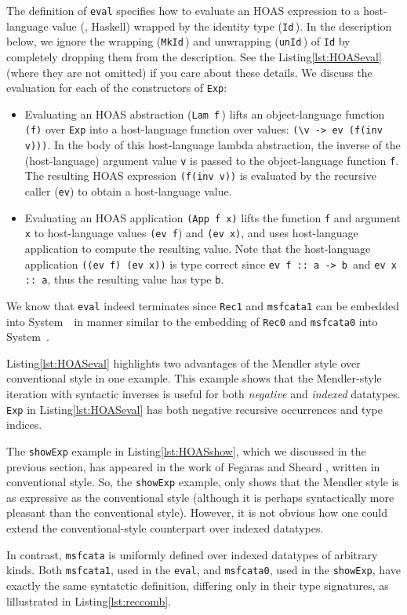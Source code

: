 The definition of \lstinline{eval} specifies how to evaluate
an HOAS expression to a host-language value (\ie, Haskell) wrapped by
the identity type (\lstinline{Id}\,). In the description below, we ignore
the wrapping (\lstinline{MkId}\,) and unwrapping (\lstinline{unId}\,) of
\lstinline{Id} by completely dropping them from the description.
See the Listing\;\ref{lst:HOASeval} (where they are not omitted)
if you care about these details. We discuss the evaluation for each of
the constructors of \lstinline{Exp}:
\begin{itemize}
	\item Evaluating an HOAS abstraction (\lstinline{Lam f}\,) lifts
		an object-language function \lstinline{(f)} over \lstinline{Exp}
		into a host-language function over values:
		\lstinline{(\v -> ev (f(inv v)))}.
		In the body of this host-language lambda abstraction,
		the inverse of the (host-language) argument value \lstinline{v}
		is passed to the object-language function \lstinline{f}.
		The resulting HOAS expression \lstinline{(f(inv v))} is
		evaluated by the recursive caller (\lstinline{ev}) to
		obtain a host-language value.

	\item Evaluating an HOAS application \lstinline{(App f x)} lifts
		the function \lstinline{f} and argument \lstinline{x} to
		host-language values \lstinline{(ev f}) and \lstinline{(ev x)},
		and uses host-language application to compute
		the resulting value. Note that the host-language application
		\lstinline{((ev f) (ev x))} is type correct since
		\lstinline{ev f :: a -> b}\, and \lstinline{ev x :: a},
		thus the resulting value has type \lstinline{b}.
\end{itemize}
We know that \lstinline{eval} indeed terminates since \lstinline{Rec1} and
\lstinline{msfcata1} can be embedded into System~\Fw\ in manner similar to
the embedding of \lstinline{Rec0} and \lstinline{msfcata0} into System~\Fw.

Listing\;\ref{lst:HOASeval} highlights two advantages of the Mendler style over
conventional style in one example. This example shows that the Mendler-style
iteration with syntactic inverses is useful for both \textit{negative} and
\textit{indexed} datatypes. \lstinline{Exp} in Listing\;\ref{lst:HOASeval} has
both negative recursive occurrences and type indices.

The \lstinline{showExp} example in Listing\;\ref{lst:HOASshow},
which we discussed in the previous section, has appeared in the work
of Fegaras and Sheard \cite{FegShe96}, written in conventional style.
So, the \lstinline{showExp} example, only shows that the Mendler style is
as expressive as the conventional style (although it is
perhaps syntactically more pleasant than the conventional style).
However, it is not obvious how one could extend the conventional-style
counterpart over indexed datatypes.

In contrast, \lstinline{msfcata} is uniformly defined over indexed datatypes of
arbitrary kinds. Both \lstinline{msfcata1}, used in the \lstinline{eval},
and \lstinline{msfcata0}, used in the \lstinline{showExp}, have exactly
the same syntatctic definition, differing only in their type signatures,
as lillustrated in Listing\;\ref{lst:reccomb}.


